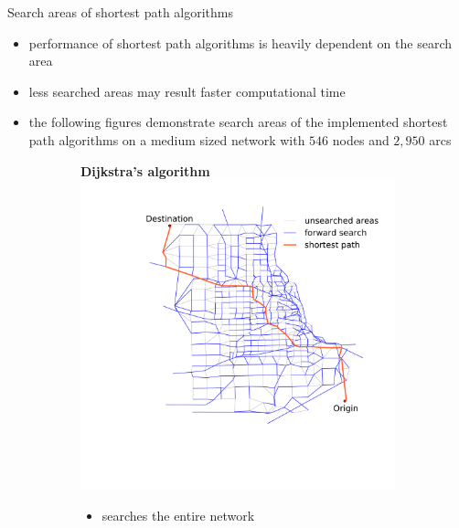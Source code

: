 \documentclass[final]{beamer}
\begin{document}
\begin{frame}{ }
\begin{columns}[t]
\begin{column}{.4\linewidth}
            \begin{block}{Search areas of shortest path algorithms}
                \begin{itemize}
                    \itemsep.5em
                    \item performance of shortest path algorithms is heavily dependent on the \alert{search area}
                    \item less searched areas may result faster computational time
                    \item the following figures demonstrate search areas of the implemented shortest path algorithms on a \alert{medium sized network} with $546$ nodes and $2{,}950$ arcs
                \end{itemize}
                \vspace{1em}
                \begin{figure}
                    \centering
                    \begin{subfigure}{.5\linewidth}
                        \centering
                        {\bfseries Dijkstra's algorithm }
                        \includegraphics[width=\linewidth,trim=120px 280px 48px 60px,clip]{img/dijkstra}
                        \begin{itemize}
                        \centering
                            \item searches the \alert{entire network}

\end{itemize}
\end{subfigure}
\end{figure}
\end{block}
\end{column}
\end{columns}
\end{frame}
\end{document}
